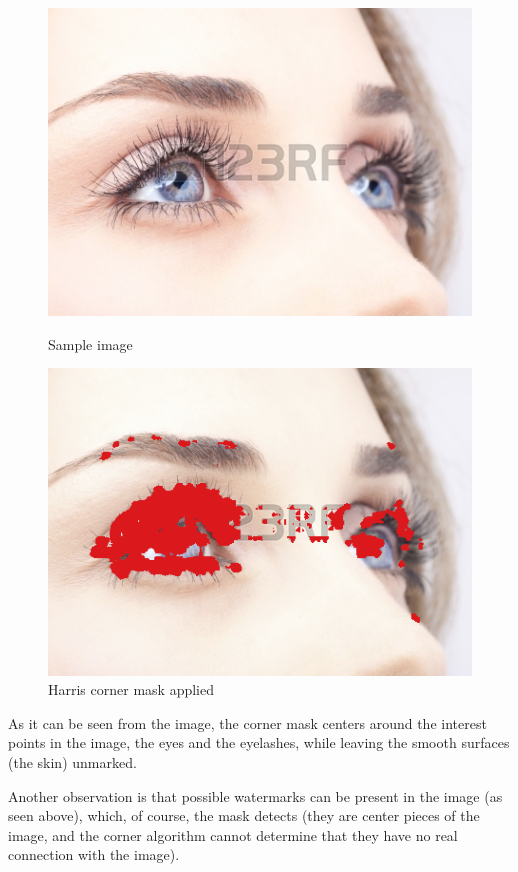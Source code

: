 \begin{figure}[ht!]
\centering
\begin{minipage}{.5\textwidth}
	\centering
	\includegraphics[width=.8\linewidth]{images/beforeHarris.png}
	\caption{Sample image}
	\label{fig:beforeHarris}
\end{minipage}%
\begin{minipage}{.5\textwidth}
	\centering
	\includegraphics[width=.8\linewidth]{images/afterHarris.png}
	\caption{Harris corner mask applied }
	\label{fig:afterHarris}
\end{minipage}
\end{figure}

As it can be seen from the image, the corner mask centers around the interest points in the image, the eyes and the eyelashes, while leaving the smooth surfaces (the skin) unmarked.

Another observation is that possible watermarks can be present in the image (as seen above), which, of course, the mask detects (they are center pieces of the image, and the corner algorithm cannot determine that they have no real connection with the image).

